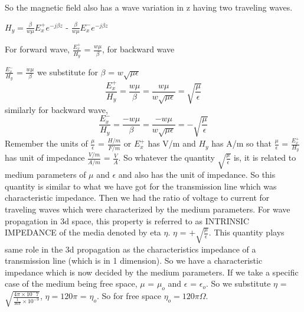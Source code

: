 So the magnetic field also has a wave variation in z having two traveling waves. 

$H_y = \frac{\beta}{w\mu}E_x^{+}e^{-j\beta z}$ - $\frac{\beta}{w\mu}E_x^{-}e^{-j\beta z}$

For forward wave, $\frac{E_x^+}{H_y}$ = $\frac{w\mu}{\beta}$, for backward wave 

$\frac{E_x^-}{H_y}$ = $\frac{w\mu}{\beta}$
 we substitute for $\beta$ = $w\sqrt{\mu\epsilon}$
\begin{dmath*}
\frac{E_x^+}{H_y} = \frac{w\mu}{\beta} = \frac{w\mu}{w\sqrt{\mu\epsilon}} = {\sqrt{\frac{\mu}{\epsilon}}}
\end{dmath*}
similarly for backward wave,
\begin{dmath*}
\frac{E_x^-}{H_y} = \frac{-w\mu}{\beta} = \frac{-w\mu}{w\sqrt{\mu\epsilon}} = {-\sqrt{\frac{\mu}{\epsilon}}}
\end{dmath*}
Remember the units of $\frac{\mu}{\epsilon}$ = $\frac{H/m}{F/m}$ or $E_x^+$ has V/m and $H_y$ has A/m so that $\frac{\mu}{\epsilon}$ = $\frac{E_x^+}{H_y}$ has unit of impedance $\frac{V/m}{A/m}$  = $\frac{V}{A}$. So whatever the quantity ${\sqrt{\frac{\mu}{\epsilon}}}$ is, it is related to medium parameters of $\mu$ and $\epsilon$  and also has the unit of impedance. So this quantity is similar to what we have got for the transmission line which was characteristic impedance. Then we had the ratio of voltage to current for traveling waves which were characterized by the medium parameters. For wave propagation in 3d space, this property is referred to as INTRINSIC IMPEDANCE of the media denoted by eta $\eta$. $\eta$ = ${+\sqrt{\frac{\mu}{\epsilon}}}$. This quantity plays same role in the 3d propagation as the characteristics impedance of a transmission line (which is in 1 dimension). So we have a characteristic impedance which is now decided by the medium parameters. If we take  a specific case of the medium being free space, $\mu$ = $\mu_{o}$ and $\epsilon$ = $\epsilon_{o}$. So we substitute $\eta$ =$\sqrt{\frac{4\pi \times 10^-7}{\frac{1}{36\pi} \times 10^{-9}}}$, $\eta = 120\pi$ = $\eta_{o}$. So for free space $\eta_{o} = 120\pi$$\Omega$.

